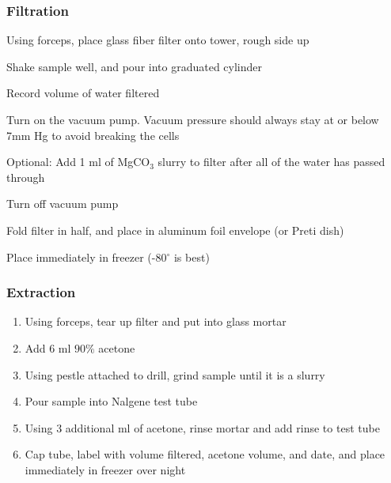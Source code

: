 \begin{appendices}
\subsubsection*{Filtration}
\begin{enumerate}
  \item Using forceps, place glass fiber filter onto tower, rough side up
  \item Shake sample well, and pour into graduated cylinder
  {\bf \item Record volume of water filtered}
  \item Turn on the vacuum pump. Vacuum pressure should always stay at or below 7mm Hg to avoid breaking the cells 
  \item Optional: Add 1 ml of MgCO$_3$ slurry to filter after all of the water has passed through
  \item Turn off vacuum pump
  \item Fold filter in half, and place in aluminum foil envelope (or Preti dish)
  \item Place immediately in freezer (-80$^\circ$ is best)
\end{enumerate}

\subsubsection*{Extraction}
\begin{enumerate}
  \item Using forceps, tear up filter and put into glass mortar
  \item Add 6 ml $90\%$ acetone
  \item Using pestle attached to drill, grind sample until it is a slurry
  \item Pour sample into Nalgene test tube
  \item Using 3 additional ml of acetone, rinse mortar and add rinse to test tube
  \item Cap tube, label with volume filtered, acetone volume, and date, and place immediately in freezer over night
\end{enumerate}


\end{appendices}
